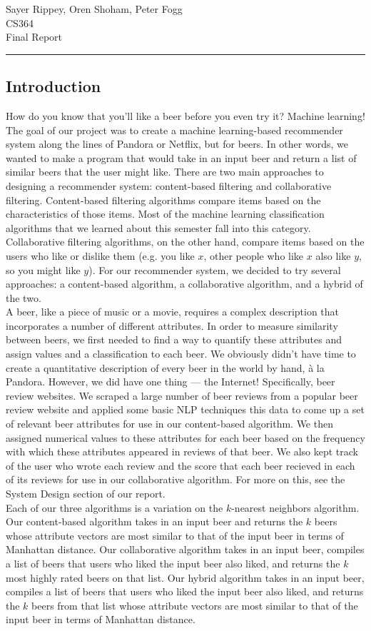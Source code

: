 \documentclass[11pt]{article}
\renewcommand{\maketitle}{
  \begin{center}
    \begin{flushright}
      Sayer Rippey, Oren Shoham, Peter Fogg \\
      CS364 \\
      Final Report
    \end{flushright}
    \rule{\linewidth}{0.1mm}
  \end{center}
}
\begin{document}
\maketitle
\subsection*{Introduction}
How do you know that you'll like a beer before you even try it? Machine learning! The goal of our project was to create a machine learning-based recommender system along the lines of Pandora or Netflix, but for beers. In other words, we wanted to make a program that would take in an input beer and return a list of similar beers that the user might like. There are two main approaches to designing a recommender system: content-based filtering and collaborative filtering. Content-based filtering algorithms compare items based on the characteristics of those items. Most of the  machine learning classification algorithms that we learned about this semester fall into this category. Collaborative filtering algorithms, on the other hand, compare items based on the users who like or dislike them (e.g. you like $x$, other people who like $x$ also like $y$, so you might like $y$). For our recommender system, we decided to try several approaches: a content-based algorithm, a collaborative algorithm, and a hybrid of the two. \\
\indent A beer, like a piece of music or a movie, requires a complex description that incorporates a number of different attributes. In order to measure similarity between beers, we first needed to find a way to quantify these attributes and assign values and a  classification to each beer. We obviously didn't have time to create a quantitative description of every beer in the world by hand, \`{a} la Pandora. However, we did have one thing --- the Internet! Specifically, beer review websites. We scraped a large number of beer reviews from a popular beer review website and applied some basic NLP techniques this data to come up a set of relevant beer attributes for use in our content-based algorithm. We then assigned numerical values to these attributes for each beer based on the frequency with which these attributes appeared in reviews of that beer.  We also kept track of the user who wrote each review and the score that each beer recieved in each of its reviews for use in our collaborative algorithm. For more on this, see the System Design section of our report. \\
\indent Each of our three algorithms is a variation on the $k$-nearest neighbors algorithm. Our content-based algorithm takes in an input beer and returns the $k$ beers whose attribute vectors are most similar to that of the input beer in terms of Manhattan distance. Our collaborative algorithm takes in an input beer, compiles a list of beers that users who liked the input beer also liked, and returns the $k$ most highly rated beers on that list. Our hybrid algorithm takes in an input beer, compiles a list of beers that users who liked the input beer also liked, and returns the $k$ beers from that list whose attribute vectors are most similar to that of the input beer in terms of Manhattan distance.
\end{document}

